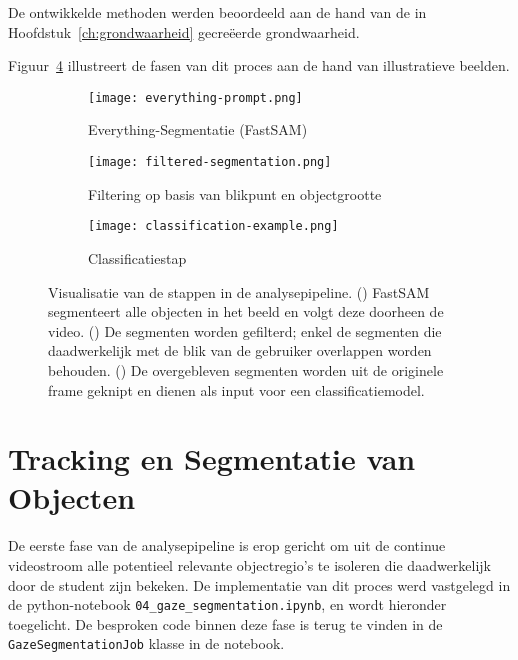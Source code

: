 De ontwikkelde methoden werden beoordeeld aan de hand van de in Hoofdstuk~\ref{ch:grondwaarheid} gecreëerde grondwaarheid.

Figuur~\ref{fig:analyse-pipeline-visualisatie} illustreert de fasen van dit proces aan de hand van illustratieve beelden.

\begin{figure}[H]
    \centering
        \begin{subfigure}[b]{0.75\textwidth}
        \centering
        \texttt{[image: everything-prompt.png]}
        \caption{Everything-Segmentatie (FastSAM)}
        \label{fig:pipeline_stap_a}
    \end{subfigure}

    \vspace{0.5cm}

    \begin{subfigure}[b]{0.75\textwidth}
    \centering
    \texttt{[image: filtered-segmentation.png]}
    \caption{Filtering op basis van blikpunt en objectgrootte}
    \label{fig:pipeline_stap_b}
    \end{subfigure}

    \vspace{0.5cm}

    \begin{subfigure}[b]{0.75\textwidth}
        \centering
        \texttt{[image: classification-example.png]}
        \caption{Classificatiestap}
        \label{fig:pipeline_stap_c}
    \end{subfigure}
    \caption[Visualisatie van de Analysepipeline]{
        \label{fig:analyse-pipeline-visualisatie}
        Visualisatie van de stappen in de analysepipeline.
        () FastSAM segmenteert alle objecten in het beeld en volgt deze doorheen de video.
        () De segmenten worden gefilterd; enkel de segmenten die daadwerkelijk met de blik van de gebruiker overlappen worden behouden.
        () De overgebleven segmenten worden uit de originele frame geknipt en dienen als input voor een classificatiemodel.
    }
\end{figure}

\section{Tracking en Segmentatie van Objecten}

De eerste fase van de analysepipeline is erop gericht om uit de continue videostroom alle potentieel relevante objectregio's 
te isoleren die daadwerkelijk door de student zijn bekeken. 
De implementatie van dit proces werd vastgelegd in de python-notebook \texttt{04\_gaze\_segmentation.ipynb},
en wordt hieronder toegelicht.
De besproken code binnen deze fase is terug te vinden in de \texttt{GazeSegmentationJob} klasse in de notebook.

